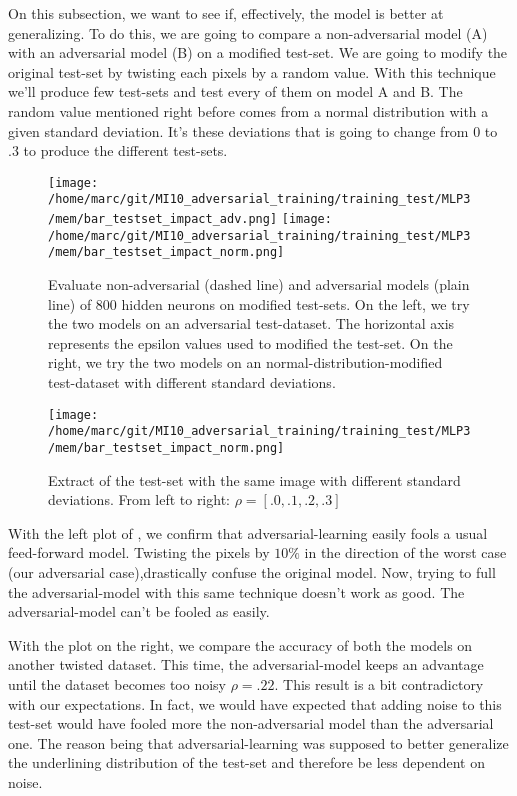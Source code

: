 			On this subsection, we want to see if, effectively, the model is better at generalizing. To do this, we are going to compare a non-adversarial model (A) with an adversarial model (B) on a modified test-set. We are going to modify the original test-set by twisting each pixels by a random value. With this technique we'll produce few test-sets and test every of them on model A and B. The random value mentioned right before comes from a normal distribution with a given standard deviation. It's these deviations that is going to change from $0$ to $.3$ to produce the different test-sets.
			
			\begin{figure}
				\centering
				\texttt{[image: /home/marc/git/MI10\_adversarial\_training/training\_test/MLP3/mem/bar\_testset\_impact\_adv.png]}
				\texttt{[image: /home/marc/git/MI10\_adversarial\_training/training\_test/MLP3/mem/bar\_testset\_impact\_norm.png]}
				\caption{Evaluate non-adversarial (dashed line) and adversarial models (plain line) of 800 hidden neurons on modified test-sets. On the left, we try the two models on an adversarial test-dataset. The horizontal axis represents the epsilon values used to modified the test-set. On the right, we try the two models on an normal-distribution-modified test-dataset with different standard deviations.}
				\label{fig:mnist_adv_noisy_ds}
			\end{figure}
			\begin{figure}
				\centering
				\texttt{[image: /home/marc/git/MI10\_adversarial\_training/training\_test/MLP3/mem/bar\_testset\_impact\_norm.png]}
				\caption{Extract of the test-set with the same image with different standard deviations. From left to right: $\rho = [.0, .1, .2, .3]$}
				\label{fig:mnist_adv_noisy_ds_img}
			\end{figure}


			With the left plot of , we confirm that adversarial-learning easily fools a usual feed-forward model. Twisting the pixels by $10\%$ in the direction of the worst case (our adversarial case),drastically confuse the original model. Now, trying to full the adversarial-model with this same technique doesn't work as good. The adversarial-model can't be fooled as easily. 

			With the plot on the right, we compare the accuracy of both the models on another twisted dataset. This time, the adversarial-model keeps an advantage until the dataset becomes too noisy $\rho=.22$. This result is a bit contradictory with our expectations. In fact, we would have expected that adding noise to this test-set would have fooled more the non-adversarial model than the adversarial one. The reason being that adversarial-learning was supposed to better generalize the underlining distribution of the test-set and therefore be less dependent on noise.


